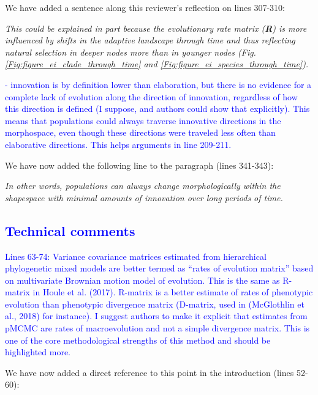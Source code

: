 \documentclass[12pt,letterpaper]{article}
\begin{document}
{We have added a sentence along this reviewer’s reflection on lines 307-310: %

\noindent\textit{This could be explained in part because the evolutionary rate matrix (\textbf{R}) is more influenced by shifts in the adaptive landscape through time and thus reflecting natural selection in deeper nodes more than in younger nodes (Fig. \ref{Fig:figure_ei_clade_through_time} and \ref{Fig:figure_ei_species_through_time}).} %

\textcolor{blue}{- innovation is by definition lower than elaboration, but there is no evidence for a complete lack of evolution along the direction of innovation, regardless of how this direction is defined (I suppose, and authors could show that explicitly). This means that populations could always traverse innovative directions in the morphospace, even though these directions were traveled less often than elaborative directions. This helps arguments in line 209-211.}

We have now added the following line to the paragraph (lines 341-343):

\noindent\textit{In other words, populations can always change morphologically within the shapespace with minimal amounts of innovation over long periods of time.} %

\subsection*{\textcolor{blue}{Technical comments}}

\textcolor{blue}{Lines 63-74: Variance covariance matrices estimated from hierarchical phylogenetic mixed models are better termed as “rates of evolution matrix” based on multivariate Brownian motion model of evolution. This is the same as R-matrix in Houle et al. (2017). R-matrix is a better estimate of rates of phenotypic evolution than phenotypic divergence matrix (D-matrix, used in (McGlothlin et al., 2018) for instance). I suggest authors to make it explicit that estimates from pMCMC are rates of macroevolution and not a simple divergence matrix. This is one of the core methodological strengths of this method and should be highlighted more.}

We have now added a direct reference to this point in the introduction (lines 52-60):

}
\end{document}
